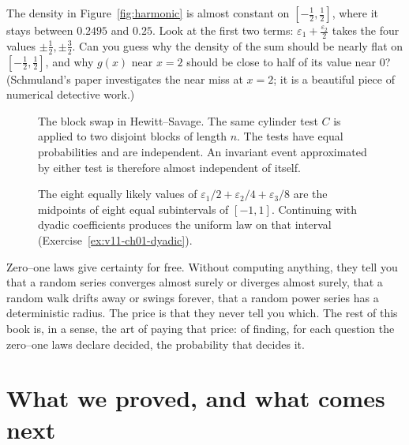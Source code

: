 \begin{think}
The density in Figure~\ref{fig:harmonic} is almost constant on $[-\frac12,\frac12]$, where it stays between $0.2495$ and $0.25$. Look at the first two terms:
$\varepsilon_1+\frac{\varepsilon_2}2$ takes the four values $\pm\frac12,\pm\frac32$. Can you guess why the density of the sum
should be nearly flat on $[-\frac12,\frac12]$, and why $g(x)$ near $x=2$ should be close to half of its value near $0$? (Schmuland's
paper investigates the near miss at $x=2$; it is a beautiful piece of numerical detective work.)
\end{think}


\begin{figure}[ht]
\centering{}
\caption{The block swap in Hewitt--Savage. The same cylinder test $C$ is applied to two disjoint blocks of length $n$. The tests have equal probabilities and are independent. An invariant event approximated by either test is therefore almost independent of itself.}
\label{fig:v11-ch01-block-swap}
\end{figure}

\begin{figure}[ht]
\centering{}
\caption{The eight equally likely values of $\varepsilon_1/2+\varepsilon_2/4+\varepsilon_3/8$ are the midpoints of eight equal subintervals of $[-1,1]$. Continuing with dyadic coefficients produces the uniform law on that interval (Exercise~\ref{ex:v11-ch01-dyadic}).}
\label{fig:v11-ch01-dyadic-sum}
\end{figure}

\begin{beauty}
Zero--one laws give certainty for free. Without computing anything, they tell you that a random series converges almost surely or
diverges almost surely, that a random walk drifts away or swings forever, that a random power series has a deterministic radius.
The price is that they never tell you which. The rest of this book is, in a sense, the art of paying that price: of finding, for each
question the zero--one laws declare decided, the probability that decides it.
\end{beauty}

\section{What we proved, and what comes next}

